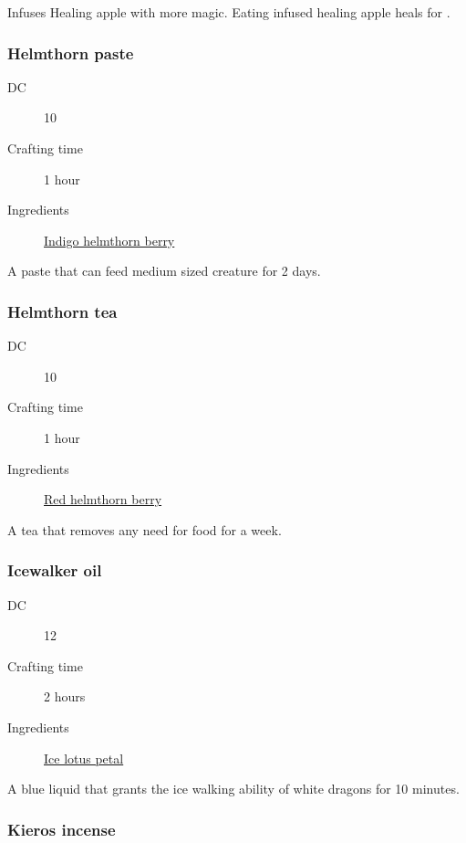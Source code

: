 Infuses Healing apple with more magic. Eating infused healing apple heals for .

\subsubsection{Helmthorn paste}
\label{Helmthorn paste}

\begin{description}
\item [DC] 10
\item [Crafting time] 1 hour
\item [Ingredients] \hyperref[Helmthorn]{Indigo helmthorn berry}
\end{description}

A paste that can feed medium sized creature for 2 days.

\subsubsection{Helmthorn tea}
\label{Helmthorn tea}

\begin{description}
\item [DC] 10
\item [Crafting time] 1 hour
\item [Ingredients] \hyperref[Helmthorn]{Red helmthorn berry}
\end{description}

A tea that removes any need for food for a week.

\subsubsection{Icewalker oil}
\label{Icewalker oil}

\begin{description}
\item [DC] 12
\item [Crafting time] 2 hours
\item [Ingredients] \hyperref[Ice Lotus]{Ice lotus petal}
\end{description}

A blue liquid that grants the ice walking ability of white dragons for 10 minutes.

\subsubsection{Kieros incense}
\label{Kieros incense}

